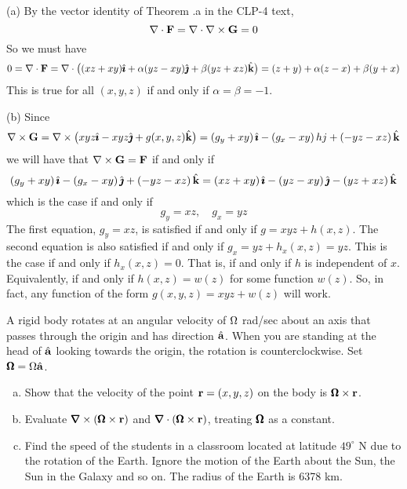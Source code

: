 \begin{solution} 
(a)
By the vector identity of Theorem .a
in the CLP-4 text,
\begin{equation*}
\nabla\cdot \mathbf{F}=\nabla\cdot \nabla\times\mathbf{G}=0
\end{equation*}
So we must have
\begin{equation*}
0=\nabla\cdot\mathbf{F}=\nabla\cdot \big((xz+xy)\hat{\pmb{\imath}}+\alpha(yz-xy)\hat{\pmb{\jmath}}+\beta(yz+xz)\hat{\mathbf{k}}\big)
=(z+y)+\alpha(z-x)+\beta(y+x)
\end{equation*}
This is true for all $(x,y,z)$ if and only if $\alpha=\beta=-1$.

(b) Since
\begin{equation*}
\nabla\times\mathbf{G}=\nabla\times\big(xyz\hat{\pmb{\imath}}-xyz\hat{\pmb{\jmath}}+g(x,y,z)\hat{\mathbf{k}}\big)
=(g_y+xy)\,\hat{\pmb{\imath}}-(g_x-xy)\,hj+(-yz-xz)\,\hat{\mathbf{k}}
\end{equation*}
we will have that $\nabla\times\mathbf{G}=\mathbf{F}$ if and only if
\begin{equation*}
(g_y+xy)\,\hat{\pmb{\imath}}-(g_x-xy)\,\hat{\pmb{\jmath}}+(-yz-xz)\,\hat{\mathbf{k}}=(xz+xy)\,\hat{\pmb{\imath}}-(yz-xy)\,\hat{\pmb{\jmath}}-(yz+xz)\,\hat{\mathbf{k}}
\end{equation*}
which is the case if and only if
\begin{equation*}
g_y=xz,\quad g_x=yz
\end{equation*}
The first equation, $g_y=xz$, is satisfied if and only if $g=xyz+h(x,z)$.
The second equation is also satisfied if and only if
$g_x=yz+h_x(x,z)=yz$. This is the case if and only if $h_x(x,z)=0$. That
is, if and only if $h$ is independent of $x$. Equivalently, if and only
if $h(x,z)=w(z)$ for some function $w(z)$. So, in fact, any function of
the form $g(x,y,z)=xyz+w(z)$ will work.

\end{solution}


\begin{question}
A rigid body rotates at an angular velocity of $\Omega$ rad/sec
about an axis that passes through the origin and has direction $\hat{\mathbf{a}}$. When
you are standing at the head of $\hat{\mathbf{a}}$ looking towards the origin, the rotation
is counterclockwise. Set $\pmb{\Omega}=\Omega\hat{\mathbf{a}}$. 
\begin{enumerate}[(a)]  
\item
Show that the velocity of the point $\mathbf{r}=(x,y,z)$ on the body is $\pmb{\Omega}\times\mathbf{r}$.
\item
Evaluate $\vnabla\times(\vOm\times\vr)$ and  
$\vnabla\cdot(\vOm\times\vr)$, treating $\pmb{\Omega}$ as a constant.
\item
Find the speed of the students in a classroom located at
latitude $49^\circ$ N due to the rotation of the Earth. Ignore the motion
of the Earth about the Sun, the Sun in the Galaxy and so on. The radius
of the Earth is 6378 km.
\end{enumerate}
\end{question}

